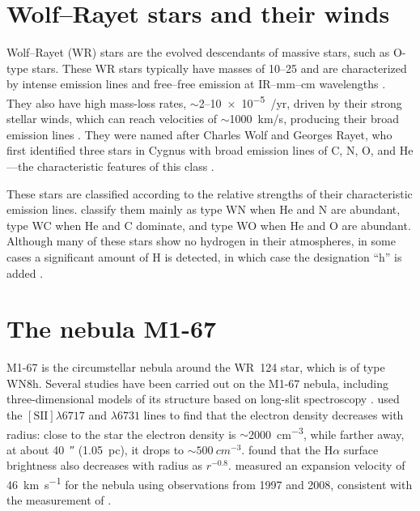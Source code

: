 \documentclass{book}
\begin{document}
\section{Wolf--Rayet stars and their winds}

Wolf--Rayet (WR) stars are the evolved descendants of massive stars,
such as O-type stars. These WR stars typically have masses of
10--\SI{25}{\msun} and are characterized by intense emission lines and
free--free emission at IR--mm--cm wavelengths \citep{crowther:2007}.
They also have high mass-loss rates, $\sim$2--\SI{10e-5}{\msun/yr},
driven by their strong stellar winds, which can reach velocities of
$\sim$\SI{1000}{km/s}, producing their broad emission lines
\citep{Hamman:2006}. They were named after Charles Wolf and Georges
Rayet, who first identified three stars in Cygnus with broad emission
lines of C, N, O, and He---the characteristic features of this class
\citep{WR:ref}.

These stars are classified according to the relative strengths of
their characteristic emission lines. \cite{VanDerHutch:2001} classify
them mainly as type WN when He and N are abundant, type WC when He and
C dominate, and type WO when He and O are abundant. Although many of
these stars show no hydrogen in their atmospheres, in some cases a
significant amount of H is detected, in which case the designation ``h''
is added \citep{SSM:1996}.

\section{The nebula M1-67}

M1-67 is the circumstellar nebula around the WR~124 star, which is of
type WN8h. Several studies have been carried out on the M1-67 nebula,
including three-dimensional models of its structure based on long-slit
spectroscopy \citep{Zavala:2022}. \cite{Marcel:2021} used the
$[\mathrm{S \scriptstyle{II}}]\lambda6717$ and $\lambda6731$ lines to
find that the electron density decreases with radius: close to the
star the electron density is $\sim$\SI{2000}{cm^{-3}}, while farther
away, at about \SI{40}{\arcsecond} (\SI{1.05}{pc}), it drops to
$\sim\SI{500}{cm^{-3}}$. \cite{Grosdidier:1998} found that the
H$\alpha$ surface brightness also decreases with radius as $r^{-0.8}$.
\cite{Mancherko:2010} measured an expansion velocity of
\SI{46}{km.s^{-1}} for the nebula using observations from 1997
\citep{Grosdidier:1998} and 2008, consistent with the measurement of
\cite{Zavala:2022}.
\end{document}
